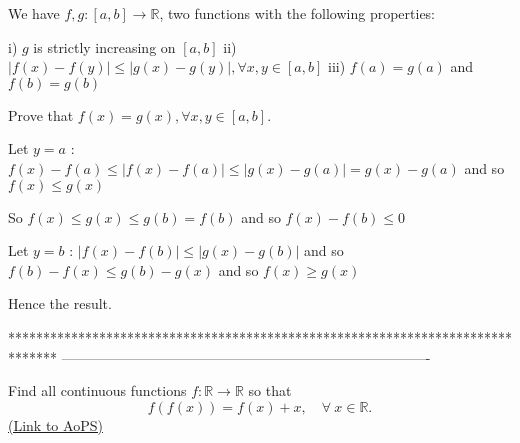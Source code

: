 \begin{solution}
	\begin{tcolorbox}We have $f,g : [a,b] \rightarrow \mathbb{R}$, two functions with the following properties:

i) $g$ is strictly increasing on $[a,b]$
ii) $|f(x) - f(y)| \leq |g(x) - g(y)|, \forall x,y \in [a,b]$
iii) $f(a) = g(a)$ and $f(b)=g(b)$

Prove that $f(x) = g(x), \forall x,y \in [a,b]$.\end{tcolorbox}
Let $y=a$ : $f(x)-f(a)\le |f(x)-f(a)|\le |g(x)-g(a)|=g(x)-g(a)$ and so $f(x)\le g(x)$

So $f(x)\le g(x)\le g(b)=f(b)$ and so $f(x)-f(b)\le 0$

Let $y=b$ : $|f(x)-f(b)|\le |g(x)-g(b)|$ and so $f(b)-f(x)\le g(b)-g(x)$ and so $f(x)\ge g(x)$

Hence the result.
\end{solution}
*******************************************************************************
-------------------------------------------------------------------------------

\begin{problem}
	Find all continuous functions $f:\mathbb{R}\to\mathbb{R}$ so that \[f(f(x))=f(x)+x,\quad \forall\ x\in\mathbb{R}.\]
	\flushright \href{https://artofproblemsolving.com/community/c6h401454}{(Link to AoPS)}
\end{problem}



